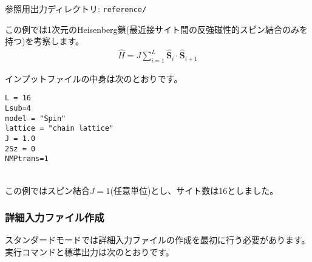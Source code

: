 参照用出力ディレクトリ: \verb|reference/|

この例では1次元のHeisenberg鎖(最近接サイト間の反強磁性的スピン結合のみを持つ)を考察します。
\begin{align}
  {\hat H} = J \sum_{i=1}^{L} {\hat {\boldsymbol S}}_i \cdot {\hat {\boldsymbol S}}_{i+1}
\end{align}

インプットファイルの中身は次のとおりです。
\\
\begin{minipage}{10cm}
\begin{screen}
\begin{verbatim}
L = 16
Lsub=4
model = "Spin"
lattice = "chain lattice"
J = 1.0
2Sz = 0
NMPtrans=1
\end{verbatim}
\end{screen}
\end{minipage}
%
\\
この例ではスピン結合$J=1$(任意単位)とし、サイト数は16としました。

\subsubsection{詳細入力ファイル作成}
スタンダードモードでは詳細入力ファイルの作成を最初に行う必要があります。
実行コマンドと標準出力は次のとおりです。

